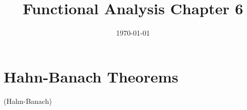 \documentclass{article}
\title{Functional Analysis Chapter 6}
\date{\today}
\begin{document}
\maketitle

\section{Hahn-Banach Theorems}
\begin{thm}
    (Hahn-Banach)
\end{thm}
\end{document}
